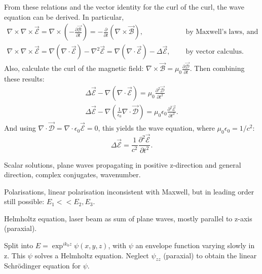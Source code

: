 From these relations and the vector identity for the curl of the curl, the wave equation can be derived.
In particular,
\begin{align*}
  \nabla\times\nabla\times\vec{\mathcal{E}}=
  \nabla\times(-\frac{\partial \vec{\mathcal{B}}}{\partial t})=
  -\frac{\partial}{\partial t}(\nabla\times\vec{\mathcal{B}}),
  \quad&\text{ by Maxwell's laws, and}\\
  \nabla\times\nabla\times\vec{\mathcal{E}}=
  \nabla(\nabla\cdotp\vec{\mathcal{E}})-\nabla^2\vec{\mathcal{E}}=
  \nabla(\nabla\cdotp\vec{\mathcal{E}})-\Delta\vec{\mathcal{E}},
  \quad&\text{ by vector calculus.}
\end{align*}
Also, calculate the curl of the magnetic field:
$\nabla\times\vec{\mathcal{B}}=\mu_0\frac{\partial\vec{\mathcal{D}}}{\partial t}$.
Then combining these results:
\begin{align*}
  \Delta \vec{\mathcal{E}}-\nabla(\nabla\cdotp\vec{\mathcal{E}})=
  \mu_0\frac{\partial^2\vec{\mathcal{D}}}{\partial t^2}\\
  \Delta \vec{\mathcal{E}}-\nabla(\frac{1}{\epsilon_0}\nabla\cdotp\vec{\mathcal{D}})=
  \mu_0\epsilon_0\frac{\partial^2\vec{\mathcal{E}}}{\partial t^2}.
\end{align*}
And using $\nabla\cdotp\vec{\mathcal{D}}=\nabla\cdotp\epsilon_0\vec{\mathcal{E}}=0$,
this yields the wave equation, where $\mu_0\epsilon_0=1/c^2$:
\begin{equation}
  \Delta\vec{\mathcal{E}}=\frac{1}{c^2}\frac{\partial^2\vec{\mathcal{E}}}{\partial t^2}.
\end{equation}

\seperate

Scalar solutions, plane waves propagating in positive z-direction and general direction, complex conjugates, wavenumber.

\seperate

Polarisations, linear polarisation inconsistent with Maxwell, but in leading order still possible: $E_1<<E_2,E_3$.

\seperate

Helmholtz equation, laser beam as sum of plane waves, mostly parallel to z-axis (paraxial).

\seperate

Split into $E=\exp^{ik_0z}\psi(x,y,z)$, with $\psi$ an envelope function varying slowly in z.
This $\psi$ solves a Helmholtz equation.
Neglect $\psi_{zz}$ (paraxial) to obtain the linear Schr\"odinger equation for $\psi$.

